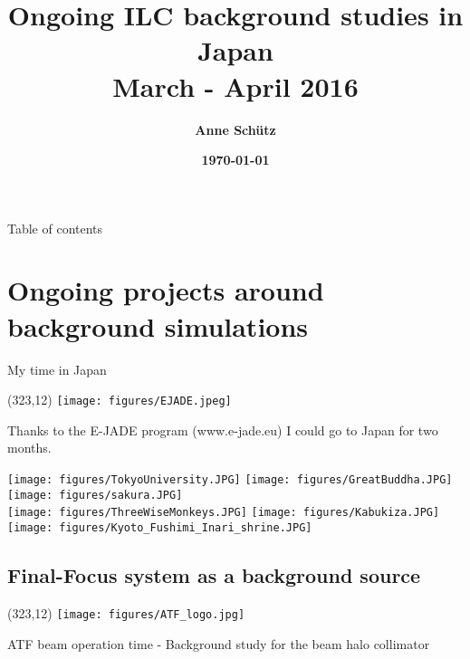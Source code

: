 \documentclass[xcolor={dvipsnames}]{beamer}
\title[ILC \& Background Simulations]{\textbf{Ongoing ILC background studies in Japan\\ March - April 2016}}
\author{\textbf{Anne Sch\"utz}}
\institute{\textbf{KIT, DESY}}
\date{\textbf{\today}}
\newcommand{\ejadelogo}{
  \setlength{\TPHorizModule}{1pt}
  \setlength{\TPVertModule}{1pt}
  \begin{textblock}{1}(323,12)
   \texttt{[image: figures/EJADE.jpeg]}
  \end{textblock}
}
\newcommand{\ATFlogo}{
  \setlength{\TPHorizModule}{1pt}
  \setlength{\TPVertModule}{1pt}
  \begin{textblock}{1}(323,12)
   \texttt{[image: figures/ATF\_logo.jpg]}
  \end{textblock}
}
\begin{document}
{
\begin{frame}
  \titlepage
\end{frame}
}

\begin{frame}{Table of contents}
  \tableofcontents
\end{frame}


\section{Ongoing projects around background simulations}

\begin{frame}{My time in Japan}
\ejadelogo
Thanks to the E-JADE program {\tiny(www.e-jade.eu)} I could go to Japan for two months.\\
\begin{center}
 \texttt{[image: figures/TokyoUniversity.JPG]}
\hspace*{0.3cm}
\texttt{[image: figures/GreatBuddha.JPG]}
\hspace*{0.3cm}
\texttt{[image: figures/sakura.JPG]}\\
\texttt{[image: figures/ThreeWiseMonkeys.JPG]}
\hspace*{0.1cm}
\texttt{[image: figures/Kabukiza.JPG]}
\hspace*{0.1cm}
\texttt{[image: figures/Kyoto\_Fushimi\_Inari\_shrine.JPG]}
\end{center}
\end{frame}



\subsection{Final-Focus system as a background source}
\begin{frame}
\ATFlogo
 \begin{center}
    \LARGE ATF beam operation time - Background study for the beam halo collimator
 \end{center}
\end{frame}
\end{document}
